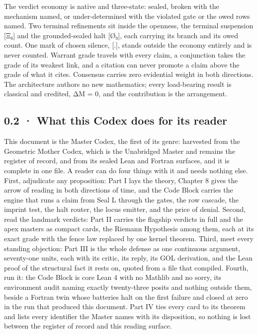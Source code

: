 \documentclass[10pt,twocolumn]{article}
\begin{document}
The verdict economy is native and three-state: sealed, broken with the
mechanism named, or under-determined with the violated gate or the owed
rows named. Two terminal refinements sit inside the openness, the
terminal suspension {[}Ξ₀{]} and the grounded-sealed halt {[}Ø₀{]}, each
carrying its branch and its owed count. One mark of chosen silence,
{[}.{]}, stands outside the economy entirely and is never counted.
Warrant grade travels with every claim, a conjunction takes the grade of
its weakest link, and a citation can never promote a claim above the
grade of what it cites. Consensus carries zero evidential weight in both
directions. The architecture authors no new mathematics; every
load-bearing result is classical and credited, ΔM = 0, and the
contribution is the arrangement.

\hypertarget{what-this-codex-does-for-its-reader}{%
\subsection{0.2 · What this Codex does for its
reader}\label{what-this-codex-does-for-its-reader}}

This document is the Master Codex, the first of its genre: harvested
from the Geometric Mother Codex, which is the Unabridged Master and
remains the register of record, and from its sealed Lean and Fortran
surfaces, and it is complete in one file. A reader can do four things
with it and needs nothing else. First, adjudicate any proposition: Part
I lays the theory, Chapter 8 gives the arrow of reading in both
directions of time, and the Code Block carries the engine that runs a
claim from Seal L through the gates, the row cascade, the imprint test,
the halt router, the locus emitter, and the price of denial. Second,
read the landmark verdicts: Part II carries the flagship verdicts in
full and the apex masters as compact cards, the Riemann Hypothesis among
them, each at its exact grade with the fence law replaced by one kernel
theorem. Third, meet every standing objection: Part III is the whole
defense as one continuous argument, seventy-one units, each with its
critic, its reply, its GOL derivation, and the Lean proof of the
structural fact it rests on, quoted from a file that compiled. Fourth,
run it: the Code Block is core Lean 4 with no Mathlib and no sorry, its
environment audit naming exactly twenty-three posits and nothing outside
them, beside a Fortran twin whose batteries halt on the first failure
and closed at zero in the run that produced this document. Part IV ties
every card to its theorem and lists every identifier the Master names
with its disposition, so nothing is lost between the register of record
and this reading surface.
\end{document}
